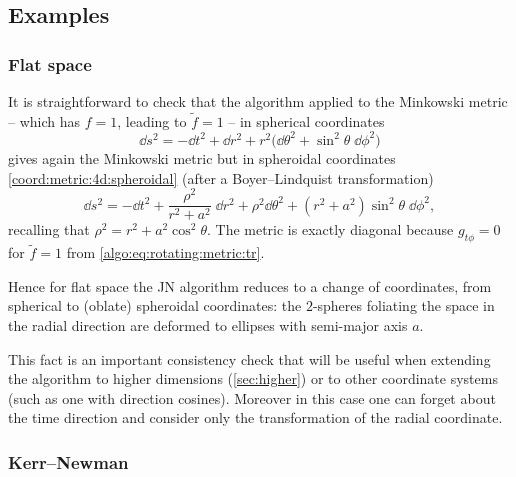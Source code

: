 \subsection{Examples}
\label{sec:algo:examples}


\subsubsection{Flat space}
\label{sec:algorithm:flat}


It is straightforward to check that the algorithm applied to the Minkowski metric -- which has $f = 1$, leading to $\tilde f = 1$ -- in spherical coordinates
\begin{equation}
	\dd s^2 = - \dd t^2 + \dd r^2 + r^2 \big( \dd\theta^2 + \sin^2 \theta\; \dd \phi^2 \big)
\end{equation} 
gives again the Minkowski metric but in spheroidal coordinates \eqref{coord:metric:4d:spheroidal} (after a Boyer--Lindquist transformation)
\begin{equation}
	\dd s^2 = - \dd t^2 + \frac{\rho^2}{r^2 + a^2}\; \dd r^2 + \rho^2 \dd\theta^2 + (r^2 + a^2) \sin^2 \theta\; \dd \phi^2,
\end{equation} 
recalling that $\rho^2 = r^2 + a^2 \cos^2 \theta$.
The metric is exactly diagonal because $g_{t\phi} = 0$ for $\tilde f = 1$ from \eqref{algo:eq:rotating:metric:tr}.

Hence for flat space the JN algorithm reduces to a change of coordinates, from spherical to (oblate) spheroidal coordinates: the $2$-spheres foliating the space in the radial direction are deformed to ellipses with semi-major axis $a$.

This fact is an important consistency check that will be useful when extending the algorithm to higher dimensions (\cref{sec:higher}) or to other coordinate systems (such as one with direction cosines).
Moreover in this case one can forget about the time direction and consider only the transformation of the radial coordinate.


\subsubsection{Kerr--Newman}
\label{sec:algorithm:kerr-newman}


